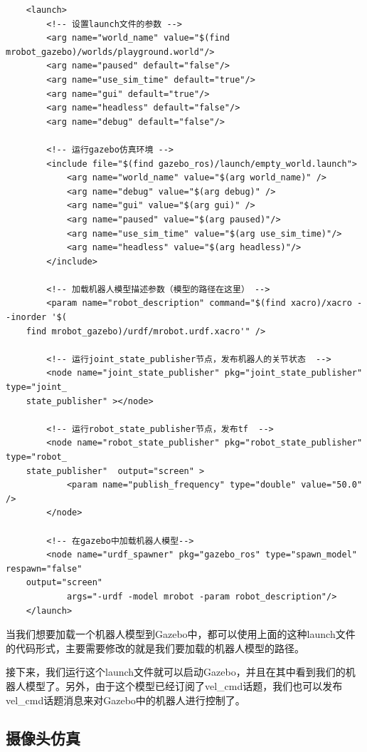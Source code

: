 \documentclass[9pt, oneside]{book}
\begin{document}
\begin{verbatim}
    <launch>
        <!-- 设置launch文件的参数 -->
        <arg name="world_name" value="$(find mrobot_gazebo)/worlds/playground.world"/>
        <arg name="paused" default="false"/>
        <arg name="use_sim_time" default="true"/>
        <arg name="gui" default="true"/>
        <arg name="headless" default="false"/>
        <arg name="debug" default="false"/>

        <!-- 运行gazebo仿真环境 -->
        <include file="$(find gazebo_ros)/launch/empty_world.launch">
            <arg name="world_name" value="$(arg world_name)" />
            <arg name="debug" value="$(arg debug)" />
            <arg name="gui" value="$(arg gui)" />
            <arg name="paused" value="$(arg paused)"/>
            <arg name="use_sim_time" value="$(arg use_sim_time)"/>
            <arg name="headless" value="$(arg headless)"/>
        </include>

        <!-- 加载机器人模型描述参数（模型的路径在这里） -->
        <param name="robot_description" command="$(find xacro)/xacro --inorder '$(
    find mrobot_gazebo)/urdf/mrobot.urdf.xacro'" /> 

        <!-- 运行joint_state_publisher节点，发布机器人的关节状态  -->
        <node name="joint_state_publisher" pkg="joint_state_publisher" type="joint_
    state_publisher" ></node> 

        <!-- 运行robot_state_publisher节点，发布tf  -->
        <node name="robot_state_publisher" pkg="robot_state_publisher" type="robot_
    state_publisher"  output="screen" >
            <param name="publish_frequency" type="double" value="50.0" />
        </node>

        <!-- 在gazebo中加载机器人模型-->
        <node name="urdf_spawner" pkg="gazebo_ros" type="spawn_model" respawn="false" 
    output="screen"
            args="-urdf -model mrobot -param robot_description"/> 
    </launch>
\end{verbatim}

当我们想要加载一个机器人模型到Gazebo中，都可以使用上面的这种launch文件的代码形式，主要需要修改的就是我们要加载的机器人模型的路径。

接下来，我们运行这个launch文件就可以启动Gazebo，并且在其中看到我们的机器人模型了。另外，由于这个模型已经订阅了vel\_cmd话题，我们也可以发布vel\_cmd话题消息来对Gazebo中的机器人进行控制了。

\subsection{摄像头仿真}
\end{document}
